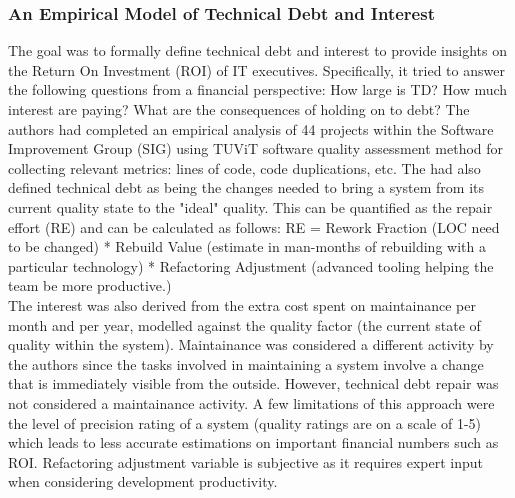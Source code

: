 \documentclass{mprop}
\begin{document}
\subsubsection{An Empirical Model of Technical Debt and Interest}  \cite{Nugroho2011}
The goal was to formally define technical debt and interest to provide insights on the Return On Investment (ROI) of IT executives.
Specifically, it tried to answer the following questions from a financial perspective: How large is TD? How much interest are paying? What are the consequences of holding on to debt?
The authors had completed an empirical analysis of 44 projects within the Software Improvement Group (SIG) using TUViT software quality assessment method for collecting relevant metrics: lines of code, code duplications, etc.
The had also defined technical debt as being the changes needed to bring a system from its current quality state to the "ideal" quality. This can be quantified as the repair effort (RE) and can be calculated as follows:
RE = Rework Fraction (LOC need to be changed) * Rebuild Value (estimate in man-months of rebuilding with a particular technology) * Refactoring Adjustment (advanced tooling helping the team be more productive.)\\
The interest was also derived from the extra cost spent on maintainance per month and per year, modelled against the quality factor (the current state of quality within the system).
Maintainance was considered a different activity by the authors since the tasks involved in maintaining a system involve a change that is immediately visible from the outside.
However, technical debt repair was not considered a maintainance activity.
A few limitations of this approach were the level of precision rating of a system (quality ratings are on a scale of 1-5) which leads to less accurate estimations on important financial numbers such as ROI.
Refactoring adjustment variable is subjective as it requires expert input when considering development productivity.
\end{document}
